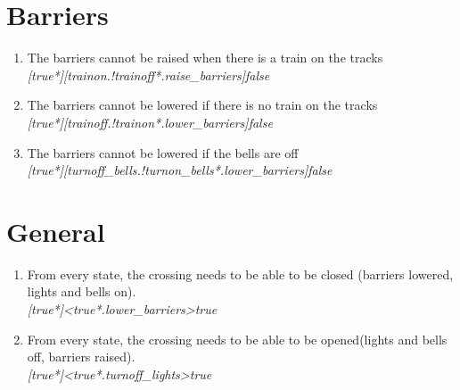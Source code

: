 \documentclass[final]{report}
\begin{document}
\section{Barriers}
\begin{enumerate}
\item The barriers cannot be raised when there is a train on the tracks\\
\textit{[true*][trainon.!trainoff*.raise\_barriers]false}
\item The barriers cannot be lowered if there is no train on the tracks\\
\textit{[true*][trainoff.!trainon*.lower\_barriers]false}
\item The barriers cannot be lowered if the bells are off\\
\textit{[true*][turnoff\_bells.!turnon\_bells*.lower\_barriers]false}
\end{enumerate}

\section{General}
\begin{enumerate}
\item From every state, the crossing needs to be able to be closed (barriers lowered, lights and bells on).\\
\textit{[true*]<true*.lower\_barriers>true}
\item From every state, the crossing needs to be able to be opened(lights and bells off, barriers raised).\\
\textit{[true*]<true*.turnoff\_lights>true}
\end{enumerate}
\end{document}
